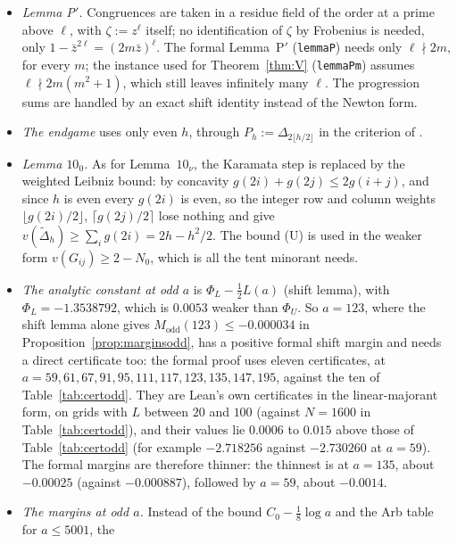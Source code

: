 \documentclass[11pt]{amsart}
\theoremstyle{definition}
\theoremstyle{remark}
\numberwithin{equation}{section}
\newcommand{\cE}{\mathcal{E}}
\newcommand{\lean}[1]{{\def\_{\textunderscore\allowbreak}\texttt{#1}}}
\begin{document}
\begin{itemize}
  $m\ge4$ and odd $m\ge69$ are handled by a closed form written with $\log m$ (the tightest case is $m=69$, with slack
  about $10^{-3}$), $m=2$ exactly, and the $28$ odd $m\in[11,67]\setminus\cE$ one by one with rational bounds on the
  logarithms (for instance $\log(2+\sqrt5)\le\frac{25}{12}\log2$).
\item \emph{Lemma P$'$.} Congruences are taken in a residue field of the order at a prime above $\ell$, with
  $\zeta:=z^\ell$ itself; no identification of $\zeta$ by Frobenius is needed, only
  $1-\bar z^{2\ell}=(2m\bar z)^\ell$. The formal Lemma~P$'$ (\lean{lemmaP}) needs only $\ell\nmid2m$, for every $m$; the
  instance used for Theorem~\ref{thm:V} (\lean{lemmaP\_m}) assumes $\ell\nmid2m(m^2+1)$, which still leaves infinitely
  many $\ell$. The progression sums are
  handled by an exact shift identity instead of the Newton form.
\item \emph{The endgame} uses only even $h$, through $P_h:=\Delta_{2\lfloor h/2\rfloor}$ in the criterion of
  \cite{Chi2Repo}.
\item \emph{Lemma $10_0$.} As for Lemma~$10_\nu$, the Karamata step is replaced by the weighted Leibniz bound: by
  concavity $g(2i)+g(2j)\le2g(i+j)$, and since $h$ is even every $g(2i)$ is even, so the integer row and column weights
  $\lfloor g(2i)/2\rfloor$, $\lceil g(2j)/2\rceil$ lose nothing and give $v(\tilde\Delta_h)\ge\sum_ig(2i)=2h-h^2/2$. The
  bound (U) is used in the weaker form $v(G_{ij})\ge2-N_0$, which is all the tent minorant needs.
\item \emph{The analytic constant at odd $a$} is $\Phi_L-\frac12L(a)$ (shift lemma), with $\Phi_L=-1.3538792$, which is
  $0.0053$ weaker than $\Phi_U$. So $a=123$, where the shift lemma alone gives $M_{\mathrm{odd}}(123)\le-0.000034$ in
  Proposition~\ref{prop:marginsodd}, has a positive formal shift margin and needs a direct certificate too: the formal
  proof uses eleven certificates, at $a=59,61,67,91,95,111,117,123,135,147,195$, against the ten of
  Table~\ref{tab:certodd}. They are Lean's own certificates in the linear-majorant form, on grids with $L$ between $20$
  and $100$ (against $N=1600$ in Table~\ref{tab:certodd}), and their values lie $0.0006$ to $0.015$ above those of
  Table~\ref{tab:certodd} (for example $-2.718256$ against $-2.730260$ at $a=59$). The formal margins are therefore
  thinner: the thinnest is at $a=135$, about $-0.00025$ (against $-0.000887$), followed by $a=59$, about $-0.0014$.
\item \emph{The margins at odd $a$.} Instead of the bound $C_0-\frac18\log a$ and the Arb table for $a\le5001$, the

\end{itemize}
\end{document}
